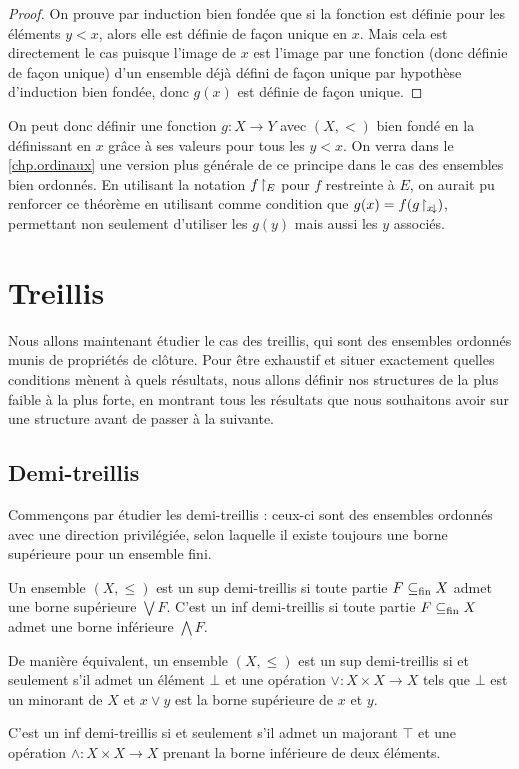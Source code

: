 \begin{proof}
  On prouve par induction bien fondée que si la fonction est définie pour les
  éléments $y < x$, alors elle est définie de façon unique en $x$. Mais cela
  est directement le cas puisque l'image de $x$ est l'image par une fonction
  (donc définie de façon unique) d'un ensemble déjà défini de façon unique par
  hypothèse d'induction bien fondée, donc $g(x)$ est définie de façon unique.
\end{proof}

On peut donc définir une fonction $g : X \to Y$ avec $(X,<)$ bien fondé en la
définissant en $x$ grâce à ses valeurs pour tous les $y < x$. On verra dans le
\cref{chp.ordinaux} une version plus générale de ce principe dans le cas des
ensembles bien ordonnés. En utilisant la notation $f\!\upharpoonright_{E}$ pour \og $f$
restreinte à $E$\fg, on aurait pu renforcer ce théorème en utilisant comme
condition que $g(x) = f(g\!\upharpoonright_{x\!\downarrow})$, permettant non seulement
d'utiliser les $g(y)$ mais aussi les $y$ associés.

\section{Treillis}

Nous allons maintenant étudier le cas des treillis, qui sont des ensembles
ordonnés munis de propriétés de clôture. Pour être exhaustif et situer
exactement quelles conditions mènent à quels résultats, nous allons définir nos
structures de la plus faible à la plus forte, en montrant tous les résultats que
nous souhaitons avoir sur une structure avant de passer à la suivante.

\subsection{Demi-treillis}

Commençons par étudier les demi-treillis : ceux-ci sont des ensembles ordonnés
avec une direction privilégiée, selon laquelle il existe toujours une borne
supérieure pour un ensemble fini.

\begin{definition}
  Un ensemble $(X,\leq)$ est un sup demi-treillis si toute partie $F\subseteq_{\mathrm{fin}} X$
  admet une borne supérieure $\bigvee F$. C'est un inf demi-treillis si toute
  partie $F\subseteq_{\mathrm{fin}} X$ admet une borne inférieure $\bigwedge F$.
\end{definition}

\begin{property}
  De manière équivalent, un ensemble $(X,\leq)$ est un sup demi-treillis si et
  seulement s'il admet un élément $\bot$ et une opération
  $\lor : X \times X \to X$ tels que $\bot$ est un minorant de $X$ et
  $x\lor y$ est la borne supérieure de $x$ et $y$.

  C'est un inf demi-treillis si et seulement s'il admet un majorant $\top$ et
  une opération $\land : X \times X \to X$ prenant la borne inférieure de deux
  éléments.
\end{property}

